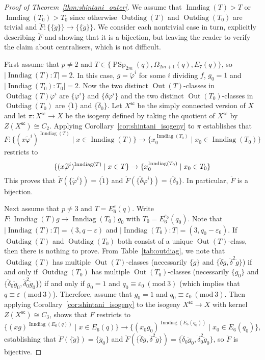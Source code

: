 \documentclass[11pt]{article}
\numberwithin{equation}{section}
\theoremstyle{shdefinition}
\theoremstyle{shplain}
\renewcommand{\d}{\delta}
\newcommand{\e}{\varepsilon}
\newcommand{\p}{\varphi}
\renewcommand{\wp}{\widetilde{\varphi}}
\newcommand{\<}{\langle}
\renewcommand{\>}{\rangle}
\newcommand{\Out}{\operatorname{Out}}
\newcommand{\Inndiag}{\operatorname{Inndiag}}
\newcommand{\Outdiag}{\operatorname{Outdiag}}
\renewcommand{\:}{\colon}
\renewcommand{\mod}[1]{\mathrm{ \ } (\mathrm{mod\ } #1)}
\newcommand{\PSp}{\operatorname{PSp}}
\newcommand{\Om}{\Omega}
\begin{document}
\begin{proof}[Proof of Theorem~\ref{thm:shintani_outer}]
We assume that $\Inndiag(T) > T$ or $\Inndiag(T_0) > T_0$ since otherwise $\Outdiag(T)$ and $\Outdiag(T_0)$ are trivial and $\ddot{F}\:\{ \{ \ddot{g} \} \} \to \{ \{ \ddot{g} \} \}$. We consider each nontrivial case in turn, explicitly describing $\ddot{F}$ and showing that it is a bijection, but leaving the reader to verify the claim about centralisers, which is not difficult.

First assume that $p \neq 2$ and $T \in \{ \PSp_{2m}(q), \Om_{2m+1}(q), E_7(q) \}$, so $|\Inndiag(T):T|=2$. In this case, $g = \wp^i$ for some $i$ dividing $f$, $g_0 = 1$ and $|\Inndiag(T_0):T_0|=2$. Now the two distinct $\Out(T)$-classes in $\Outdiag(T)\ddot{\p}^i$ are $\{\ddot{\p}^i\}$ and $\{\ddot{\d}\ddot{\p}^i\}$ and the two distinct $\Out(T_0)$-classes in $\Outdiag(T_0)$ are $\{\ddot{1}\}$ and $\{\ddot{\d}_0\}$. Let $X^{\mathsf{sc}}$ be the simply connected version of $X$ and let $\pi\:X^{\mathsf{sc}} \to X$ be the isogeny defined by taking the quotient of $X^{\mathsf{sc}}$ by $Z(X^{\mathsf{sc}}) \cong C_2$. Applying Corollary~\ref{cor:shintani_isogeny} to $\pi$ establishes that
\[
F\: \{ (x\wp^i)^{\Inndiag(T)} \mid x \in \Inndiag(T) \} \to \{ x_0^{\Inndiag(T_0)} \mid x_0 \in \Inndiag(T_0) \}
\]
restricts to
\[
\{ (x\wp^i)^{\Inndiag(T)} \mid x \in T \} \to \{  x_0^{\Inndiag(T_0)} \mid x_0 \in T_0 \} \\
\]
This proves that $\ddot{F}(\{ \ddot{\p}^i \}) = \{ \ddot{1} \}$ and $\ddot{F}(\{ \ddot{\d}\p^i \}) = \{ \ddot{\d}_0 \}$. In particular, $\ddot{F}$ is a bijection.

Next assume that $p \neq 3$ and $T = E_6^\e(q)$. Write $F\:\Inndiag(T)g \to \Inndiag(T_0)g_0$ with $T_0 = E_6^{\e_0}(q_0)$. Note that $|\Inndiag(T):T|=(3,q-\e)$ and $|\Inndiag(T_0):T|=(3,q_0-\e_0)$. If $\Outdiag(T)$ and $\Outdiag(T_0)$ both consist of a unique $\Out(T)$-class, then there is nothing to prove. From Table~\ref{tab:outdiag}, we note that $\Outdiag(T)$ has multiple $\Out(T)$-classes (necessarily $\{ \ddot{g} \}$ and $\{ \ddot{\d}\ddot{g}, \ddot{\d}^2\ddot{g} \}$) if and only if $\Outdiag(T_0)$ has multiple $\Out(T_0)$-classes (necessarily $\{ \ddot{g}_0 \}$ and $\{ \ddot{\d}_0\ddot{g}_0, \ddot{\d}_0^2\ddot{g}_0 \}$) if and only if $g_0 = 1$ and $q_0 \equiv \e_0 \mod{3}$ (which implies that $q \equiv \e \mod{3}$). Therefore, assume that $g_0=1$ and $q_0 \equiv \e_0 \mod{3}$. Then applying Corollary~\ref{cor:shintani_isogeny} to the isogeny $X^{\mathsf{sc}} \to X$ with kernel $Z(X^{\mathsf{sc}}) \cong C_3$, shows that $F$ restricts to
\[
\{ (xg)^{\Inndiag(E_6(q))} \mid x \in E_6(q) \} \to \{ (x_0g_0)^{\Inndiag(E_6(q_0))} \mid x_0 \in E_6(q_0) \},
\]
establishing that $\ddot{F}(\{\ddot{g}\}) = \{\ddot{g}_0\}$ and $\ddot{F}(\{\ddot{\d}\ddot{g},\ddot{\d}^2\ddot{g}\}) = \{\ddot{\d}_0\ddot{g}_0,\ddot{\d}_0^2\ddot{g}_0\}$, so $\ddot{F}$ is bijective.


\end{proof}
\end{document}
